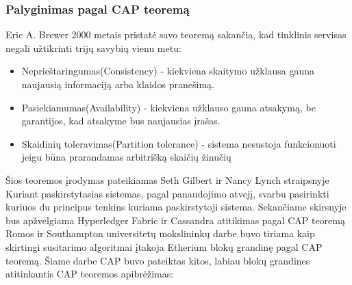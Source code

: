 \documentclass{VUMIFPSkursinis}
\begin{document}
\subsubsection{Palyginimas pagal CAP teoremą}
		Eric A. Brewer 2000 \cite{CAP} metais pristatė savo teoremą sakančia, kad tinklinis servisas negali užtikrinti trijų savybių vienu metu:
		\begin{itemize}
			\item{Neprieštaringumas(Consistency) - kiekviena skaitymo užklausa gauna naujausią informaciją arba klaidos pranešimą.}
			\item{Pasiekiamumas(Availability) - kiekviena užklauso gauna atsakymą, be garantijos, kad atsakyme bus naujausias įrašas. }
			\item{Skaidinių toleravimas(Partition tolerance) - sistema nesustoja funkcionuoti jeigu būna prarandamas arbitrišką skaičių žinučių}
		\end{itemize}
		Šios teoremos įrodymas pateikiamas Seth Gilbert ir Nancy Lynch straipsnyje \cite{CAPP}
		\linebreak
		Kuriant paskirstytasias sistemas, pagal panaudojimo atvejį, svarbu pasirinkti kuriuos du principus tenkins kuriama paskirstytoji sistema.
		Sekančiame skirsnyje bus apžvelgiama Hyperledger Fabric ir Cassandra atitikimas pagal CAP teoremą
		Romos ir Southampton universitetų mokslininkų darbe \cite{BCCAP} buvo tiriama kaip skirtingi susitarimo algoritmai įtakoja Etherium blokų grandinę
		pagal CAP teoremą. Šiame darbe CAP buvo pateiktas kitos, labiau blokų grandines atitinkantis CAP teoremos apibrėžimas:
	
\end{document}
